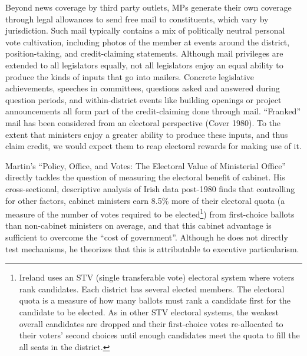 \documentclass[letter,12pt]{article}
\begin{document}
Beyond news coverage by third party outlets, MPs generate their own coverage through legal allowances to send free mail to constituents, which vary by jurisdiction. Such mail typically contains a mix of politically neutral personal vote cultivation, including photos of the member at events around the district, position-taking, and credit-claiming statements. Although mail privileges are extended to all legislators equally, not all legislators enjoy an equal ability to produce the kinds of inputs that go into mailers. Concrete legislative achievements, speeches in committees, questions asked and answered during question periods, and within-district events like building openings or project announcements all form part of the credit-claiming done through mail. ``Franked'' mail has been considered from an electoral perspective (Cover 1980). To the extent that ministers enjoy a greater ability to produce these inputs, and thus claim credit, we would expect them to reap electoral rewards for making use of it.

Martin's ``Policy, Office, and Votes: The Electoral Value of Ministerial Office'' directly tackles the question of measuring the electoral benefit of cabinet. His cross-sectional, descriptive analysis of Irish data post-1980 finds that controlling for other factors, cabinet ministers earn 8.5\% more of their electoral quota (a measure of the number of votes required to be elected\footnote{Ireland uses an STV (single transferable vote) electoral system where voters rank candidates. Each district has several elected members. The electoral quota is a measure of how many ballots must rank a candidate first for the candidate to be elected. As in other STV electoral systems, the weakest overall candidates are dropped and their first-choice votes re-allocated to their voters' second choices until enough candidates meet the quota to fill the all seats in the district.}) from first-choice ballots than non-cabinet ministers on average, and that this cabinet advantage is sufficient to overcome the ``cost of government''. Although he does not directly test mechanisms, he theorizes that this is attributable to executive particularism.
\end{document}
